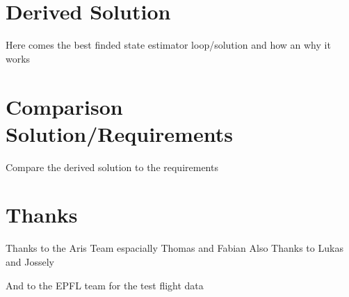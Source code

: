 \section{Derived Solution}
Here comes the best finded state estimator loop/solution and how an why it works

\section{Comparison Solution/Requirements}
Compare the derived solution to the requirements

\section{Thanks}
Thanks to the Aris Team espacially Thomas and Fabian
Also Thanks to Lukas and Jossely

And to the EPFL team for the test flight data

